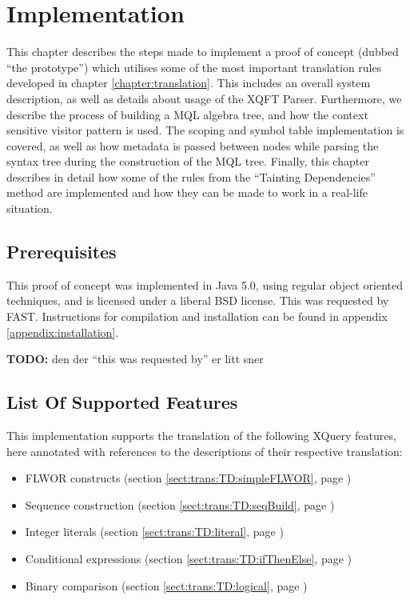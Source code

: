 \chapter{Implementation}
\label{chapter:implementation}
This chapter describes the steps made to implement a proof of concept (dubbed
``the prototype'') which utilises some of the most important translation
rules developed in chapter \ref{chapter:translation}. This includes an overall system
description, as well as details about usage of the XQFT Parser. Furthermore, we
describe the process of building a MQL algebra tree, and how the context
sensitive visitor pattern is used. The scoping and symbol table implementation
is covered, as well as how metadata is passed between nodes while parsing the
syntax tree during the construction of the MQL tree. Finally, this chapter describes in
detail how some of the rules from the ``Tainting Dependencies'' method are
implemented and how they can be made to work in a real-life situation.

\section{Prerequisites}
This proof of concept was implemented in Java 5.0, using regular object
oriented techniques, and is licensed under a liberal BSD license.
This was requested by FAST. Instructions for compilation and installation can
be found in appendix \ref{appendix:installation}.

\textbf{\LARGE TODO:} den der ``this was requested by'' er litt sner

\section{List Of Supported Features}
This implementation supports the translation of the following XQuery features,
here annotated with references to the descriptions of their respective
translation:
\begin{itemize}
  \item FLWOR constructs (section \ref{sect:trans:TD:simpleFLWOR}, page
  \pageref{sect:trans:TD:simpleFLWOR})
  \item Sequence construction (section \ref{sect:trans:TD:seqBuild}, page
  \pageref{sect:trans:TD:seqBuild})
  \item Integer literals (section \ref{sect:trans:TD:literal}, page
  \pageref{sect:trans:TD:literal})
  \item Conditional expressions (section \ref{sect:trans:TD:ifThenElse}, page
  \pageref{sect:trans:TD:ifThenElse})
  \item Binary comparison (section \ref{sect:trans:TD:logical}, page
  \pageref{sect:trans:TD:logical})
\end{itemize}

